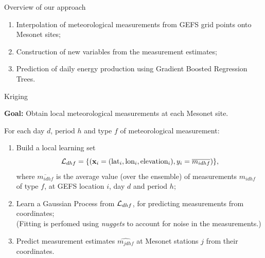 \documentclass[handout]{beamer}
\begin{document}

\begin{frame}{Overview of our approach}

\begin{enumerate}
\item Interpolation of meteorological measurements from GEFS grid points onto Mesonet sites;
\item Construction of new variables from the measurement estimates;
\item Prediction of daily energy production using Gradient Boosted Regression Trees.
\end{enumerate}

\end{frame}



\begin{frame}{Kriging}

\textbf{Goal:} Obtain local meteorological measurements at each Mesonet site.

\vskip0.25cm

For each day $d$, period $h$ and type $f$ of meteorological measurement:

\begin{enumerate}

\item Build a local learning set $${\cal L}_{dhf} = \{ (\mathbf{x}_i =
(\text{lat}_i, \text{lon}_i, \text{elevation}_i), y_i = \overline{m_{idhf}} )
\},$$  where $\overline{m_{idhf}}$ is the average value (over the ensemble) of
measurements $m_{idhf}$ of type $f$, at GEFS location $i$, day $d$ and period
$h$;

\item Learn a Gaussian Process from ${\cal L}_{dhf}$, for predicting
measurements from coordinates;\\
{\scriptsize(Fitting is perfomed using \textit{nuggets} to account for noise in the measurements.)}

\item Predict measurement estimates $\widehat{m_{jdhf}}$ at Mesonet stations
$j$ from their coordinates.

\end{enumerate}

\end{frame}


\end{document}
